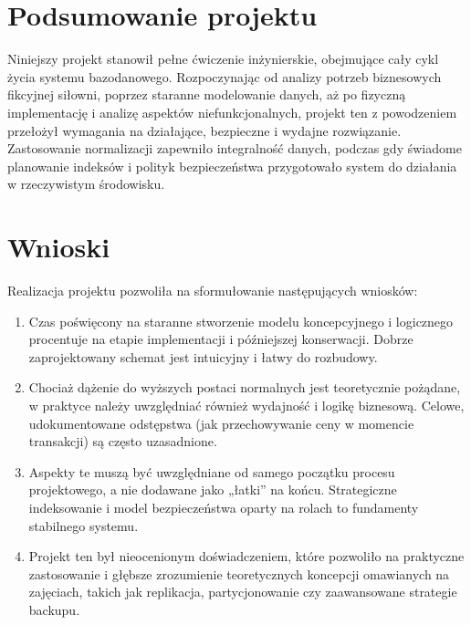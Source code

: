 \documentclass[letterpaper,10pt,polish]{sphinxmanual}
\begin{document}
\section{Podsumowanie projektu}
\label{\detokenize{rozdzial5/rozdzial5:podsumowanie-projektu}}
\sphinxAtStartPar
Niniejszy projekt stanowił pełne ćwiczenie inżynierskie, obejmujące cały cykl życia systemu bazodanowego. Rozpoczynając od analizy potrzeb biznesowych fikcyjnej siłowni, poprzez staranne modelowanie danych, aż po fizyczną implementację i analizę aspektów niefunkcjonalnych, projekt ten z powodzeniem przełożył wymagania na działające, bezpieczne i wydajne rozwiązanie. Zastosowanie normalizacji zapewniło integralność danych, podczas gdy świadome planowanie indeksów i polityk bezpieczeństwa przygotowało system do działania w rzeczywistym środowisku.


\section{Wnioski}
\label{\detokenize{rozdzial5/rozdzial5:wnioski}}
\sphinxAtStartPar
Realizacja projektu pozwoliła na sformułowanie następujących wniosków:
\begin{enumerate}
%
\item {} 
\sphinxAtStartPar
{} Czas poświęcony na staranne stworzenie modelu koncepcyjnego i logicznego procentuje na etapie implementacji i późniejszej konserwacji. Dobrze zaprojektowany schemat jest intuicyjny i łatwy do rozbudowy.

\item {} 
\sphinxAtStartPar
{} Chociaż dążenie do wyższych postaci normalnych jest teoretycznie pożądane, w praktyce należy uwzględniać również wydajność i logikę biznesową. Celowe, udokumentowane odstępstwa (jak przechowywanie ceny w momencie transakcji) są często uzasadnione.

\item {} 
\sphinxAtStartPar
{} Aspekty te muszą być uwzględniane od samego początku procesu projektowego, a nie dodawane jako „łatki” na końcu. Strategiczne indeksowanie i model bezpieczeństwa oparty na rolach to fundamenty stabilnego systemu.

\item {} 
\sphinxAtStartPar
{} Projekt ten był nieocenionym doświadczeniem, które pozwoliło na praktyczne zastosowanie i głębsze zrozumienie teoretycznych koncepcji omawianych na zajęciach, takich jak replikacja, partycjonowanie czy zaawansowane strategie backupu.

\end{enumerate}
\end{document}
